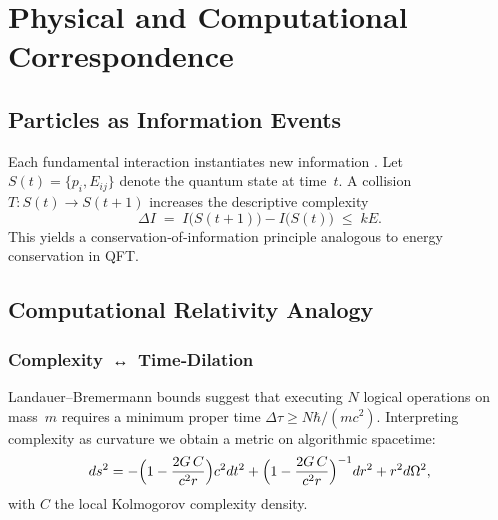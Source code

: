 
\chapter{Physical and Computational Correspondence}\label{chap:physical}

\section{Particles as Information Events}\label{sec:ppi}

Each fundamental interaction instantiates new information \cite{PPI}.  Let $S(t)=\{p_i,E_{ij}\}$ denote the quantum state at time~$t$.  A collision
$T:S(t)\to S(t+1)$ increases the descriptive complexity
\begin{equation}
  \Delta I \;=\; I\bigl(S(t+1)\bigr)-I\bigl(S(t)\bigr)
  \;\le\; k E.
\end{equation}
This yields a conservation‑of‑information principle analogous to energy conservation in QFT.

\section{Computational Relativity Analogy}\label{sec:comp-rel}

\subsection{Complexity ↔ Time‑Dilation}
Landauer–Bremermann bounds suggest that executing $N$ logical operations on mass~$m$ requires a minimum proper time $\Delta\tau\ge N\hbar/ (mc^2)$.
Interpreting complexity as curvature we obtain a metric on algorithmic spacetime:
\begin{equation}
  ds^2 = -\Bigl(1-\frac{2G\,C}{c^2 r}\Bigr)c^2 dt^2 + \Bigl(1-\frac{2G\,C}{c^2 r}\Bigr)^{-1}dr^2 + r^2 d\Omega^2,
\end{equation}
with $C$ the local Kolmogorov complexity density.

